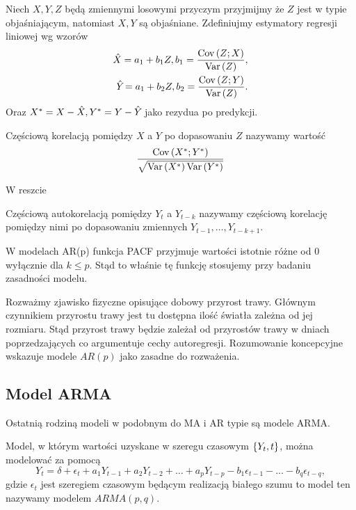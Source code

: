 \documentclass[10pt,a4paper]{book}
\begin{document}
Niech $X,Y,Z$ będą zmiennymi losowymi przyczym przyjmijmy że $Z$ jest w typie objaśniającym, natomiast $X,Y$ są objaśniane. Zdefiniujmy estymatory regresji liniowej wg wzorów
\begin{align*}
\predict{X}{} = a_1 + b_1 Z, b_1 = \frac{\Covariance{Z}{X}}{\Variance{Z}}, \\
\predict{Y}{} = a_1 + b_2 Z, b_2 = \frac{\Covariance{Z}{Y}}{\Variance{Z}}.
\end{align*} 
Oraz $X^\ast = X - \predict{X}{}, Y^\ast = Y - \predict{Y}{}$ jako rezydua po predykcji.

\begin{definition}
Częściową korelacją pomiędzy $X$ a $Y$ po dopasowaniu $Z$ nazywamy wartość
$$
\frac{\operatorname{Cov} \left( {X^\ast};{Y^\ast} \right)}{\sqrt{\operatorname{Var} \left( {X^\ast} \right)\operatorname{Var} \left( {Y^\ast} \right)}}
$$
\end{definition}

W reszcie 
\begin{definition}[PACF] 
Częściową autokorelacją pomiędzy $Y_t$ a $Y_{t-k}$ nazywamy częściową korelację pomiędzy nimi po dopasowaniu zmiennych $Y_{t-1}, \ldots, Y_{t-k+1}$.
\end{definition}

\begin{remark}
W modelach AR(p) funkcja PACF przyjmuje wartości istotnie różne od 0 wyłącznie dla $k \leq p$. Stąd to właśnie tę funkcję stosujemy przy badaniu zasadności modelu.
\end{remark}

\begin{example}
Rozważmy zjawisko fizyczne opisujące dobowy przyrost trawy. Głównym czynnikiem przyrostu trawy jest tu dostępna ilość światła zależna od jej rozmiaru. Stąd przyrost trawy będzie zależał od przyrostów trawy w dniach poprzedzających co argumentuje cechy autoregresji. Rozumowanie koncepcyjne wskazuje modele $AR(p)$ jako zasadne do rozważenia.
\end{example}

\subsection{Model ARMA}

Ostatnią rodziną modeli w podobnym do MA i AR typie są modele ARMA.

\begin{definition}

Model, w którym wartości uzyskane w szeregu czasowym $\left\lbrace {{Y_t}, {t}} \right\rbrace$, można modelować za pomocą
$$
Y_t = \delta + \epsilon_t + a_1 Y_{t-1} + a_2 Y_{t-2} + \ldots + a_p Y_{t-p} - b_1 \epsilon_{t-1} -\ldots - b_q \epsilon_{t-q} ,
$$
gdzie $\epsilon_t $ jest szeregiem czasowym będącym realizacją białego szumu to model ten nazywamy modelem  $ARMA(p,q)$.
\end{definition}
\end{document}
